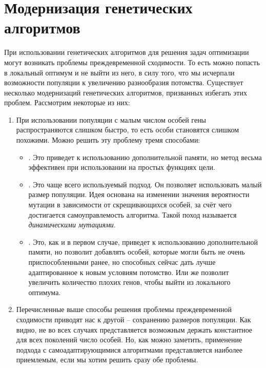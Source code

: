 \chapter{Модернизация генетических алгоритмов}
При использовании генетических алгоритмов для решения задач оптимизации могут возникать проблемы преждевременной сходимости. То есть можно попасть в локальный оптимум и не выйти из него, в силу того, что мы исчерпали возможности популяции к увеличению разнообразия потомства. Существует несколько модернизаций генетических алгоритмов, призванных избегать этих проблем. Рассмотрим некоторые из них:

\begin{enumerate}
\item При использовании популяции с малым числом особей гены распространяются слишком быстро, то есть особи становятся слишком похожими. Можно решить эту проблему тремя способами:
	 \begin{itemize}[label=$\ast$]
	\item {}. Это приведет к использованию дополнительной памяти, но метод весьма эффективен при использовании на простых функциях цели.
	\item {}. Это чаще всего используемый подход. Он позволяет использовать малый размер популяции. Идея основана на изменении значения вероятности мутации в зависимости от скрещивающихся особей, за счёт чего достигается самоуправлемость алгоритма. Такой поход называется \textit{динамическими мутациями}.
	 \item {}. Это, как и в первом случае, приведет к использованию дополнительной памяти, но позволит добавлять особей, которые могли быть не очень приспособленными ранее, но способных сейчас дать лучше адаптированное к новым условиям потомство. Или же позволит увеличить количество плохих генов, чтобы выйти из локального оптимума. 
	\end{itemize}
\item Перечисленные выше способы решения проблемы преждевременной сходимости приводят нас к другой -- сохранению размеров популяции. Как видно, не во всех случаях представляется возможным держать константное для всех поколений число особей. Но, как можно заметить, применение подхода с самоадаптирующимися алгоритмами представляется наиболее приемлемым, если мы хотим решить сразу обе проблемы. 
\end{enumerate}

